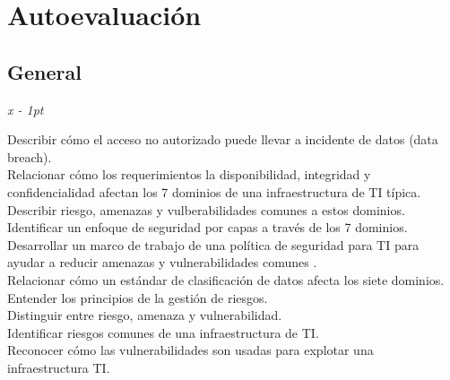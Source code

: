 \chapter*{Autoevaluación}


\section*{General}

\begin{flushright}
   \textit{x - 1pt}
\end{flushright}

\noindent Describir cómo el acceso no autorizado puede llevar a incidente de datos (data breach).\\


\noindent Relacionar cómo los requerimientos la disponibilidad, integridad y confidencialidad afectan los 7 dominios de una infraestructura de TI típica.\\


\noindent Describir riesgo, amenazas y vulberabilidades comunes a estos dominios.\\


\noindent Identificar un enfoque de seguridad por capas a través de los 7 dominios.\\


\noindent Desarrollar un marco de trabajo de una política de seguridad para TI para ayudar a reducir amenazas y vulnerabilidades comunes .\\


\noindent Relacionar cómo un estándar de clasificación de datos afecta los siete dominios.\\



\noindent Entender los principios de la gestión de riesgos.\\


\noindent Distinguir entre riesgo, amenaza y vulnerabilidad.\\


\noindent Identificar riesgos comunes de una infraestructura de TI.\\


\noindent Reconocer cómo las vulnerabilidades son usadas para explotar una infraestructura TI.\\








